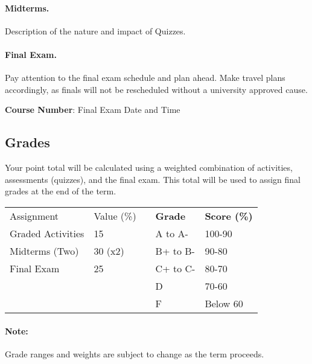\documentclass{article}
\begin{document}
\paragraph{Midterms.} Description of the nature and impact of Quizzes.

\paragraph{Final Exam.} Pay attention to the final exam schedule and plan ahead.  Make travel plans accordingly, as finals will not be rescheduled without a university approved cause.

\textbf{Course Number}: Final Exam Date and Time


\subsection*{Grades}

Your point total will be calculated using a weighted combination of activities, assessments (quizzes), and the final exam. This total will be used to assign final grades at the end of the term.

\begin{table}[ht]
\begin{tabular}{lll|l|l|}
\cline{1-2} \cline{4-5}
\multicolumn{1}{|l|}{Assignment}         & \multicolumn{1}{l|}{Value (\%)} & \textbf{} & \textbf{Grade} & \textbf{Score (\%)} \\ \cline{1-2} \cline{4-5} 
\multicolumn{1}{|l|}{Graded   Activities} & \multicolumn{1}{l|}{15}         &           & A to A-        & 100-90              \\ \cline{1-2}
\multicolumn{1}{|l|}{Midterms (Two)}      & \multicolumn{1}{l|}{30 (x2)}    &           & B+ to B-       & 90-80               \\ \cline{1-2}
\multicolumn{1}{|l|}{Final   Exam}        & \multicolumn{1}{l|}{25}         &           & C+ to C-       & 80-70               \\ \cline{1-2}
                                          &                                 &           & D              & 70-60               \\  
                                          &                                 &           & F              & Below 60            \\ \cline{4-5} 
\end{tabular}
\end{table}

\paragraph{Note:}Grade ranges and weights are subject to change as the term proceeds.
\end{document}
